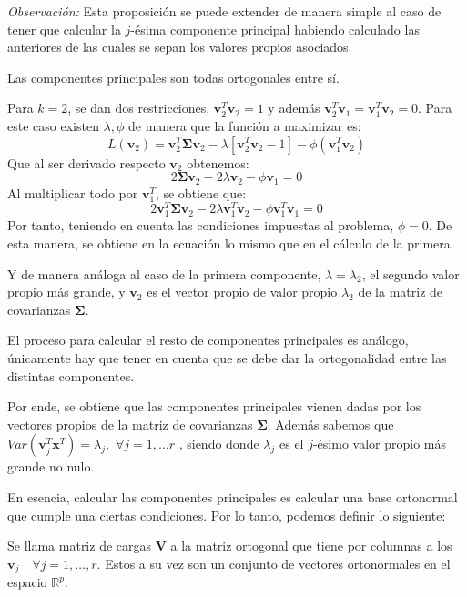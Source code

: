 \noindent \emph{Observación: } Esta proposición se puede extender de manera simple al caso de tener que calcular la $j$-ésima componente principal habiendo calculado las anteriores de las cuales se sepan los valores propios asociados. 

\begin{coro}
Las componentes principales son todas ortogonales entre sí. 
\end{coro}

\noindent Para $k=2$, se dan dos restricciones, $\textbf{v}_2^T\textbf{v}_2=1$ y además $\textbf{v}_2^T \textbf{v}_1=\textbf{v}_1^T \textbf{v}_2=0$. Para este caso existen $\lambda, \phi$ de manera que la función a maximizar es:
\begin{equation}
 L(\textbf{v}_2)=\textbf{v}_2^T \mathbf{\Sigma} \textbf{v}_2 - \lambda[\textbf{v}_2^T \textbf{v}_2-1]-\phi(\textbf{v}_1^T \textbf{v}_2)
\end{equation}
Que al ser derivado respecto $\textbf{v}_2$ obtenemos:
\begin{equation}
2\mathbf{\Sigma} \textbf{v}_2 - 2\lambda\textbf{v}_2-\phi \textbf{v}_1=0
\end{equation}
Al multiplicar todo por $\mathbf{v}_1^T$, se obtiene que:
\begin{equation}
2\mathbf{v}_1^T\mathbf{\Sigma}\mathbf{v}_2-2\lambda \mathbf{v}_1^T \mathbf{v}_2-\phi \mathbf{v}_1^T\mathbf{v}_1=0
\end{equation}
\noindent Por tanto, teniendo en cuenta las condiciones impuestas al problema, $\phi=0$. De esta manera, se obtiene en la ecuación lo mismo que en el cálculo de la primera. 

\noindent Y de manera análoga al caso de la primera componente, $\lambda=\lambda_2$, el segundo valor propio más grande, y $\mathbf{v}_2$ es el vector propio de valor propio $\lambda_2$ de la matriz de covarianzas $\mathbf{\Sigma}$.

\noindent El proceso para calcular el resto de componentes principales es análogo, únicamente hay que tener en cuenta que se debe dar la ortogonalidad entre las distintas componentes. 

\noindent Por ende, se obtiene que las componentes principales vienen dadas por los vectores propios de la matriz de covarianzas $\mathbf{\Sigma} $. Además sabemos que $Var(\mathbf{v}_j^T \mathbf{x}^T)=\lambda_j,$ $ \forall j=1,\ldots r$ , siendo donde $\lambda_j$ es el $j$-ésimo valor propio más grande no nulo. 

\noindent En esencia, calcular las componentes principales es calcular una base ortonormal que cumple una ciertas condiciones. Por lo tanto, podemos definir lo siguiente: 
\begin{defi}
Se llama matriz de cargas $\mathbf{V}$ a la matriz ortogonal que tiene por columnas a los $\mathbf{v}_j\quad \forall j=1,\ldots, r$. Estos a su vez son un conjunto de vectores ortonormales en el espacio $\mathbb{R}^p$.
\end{defi}

